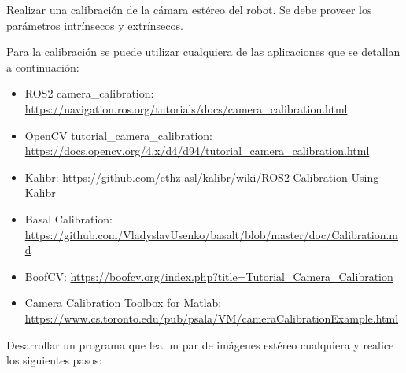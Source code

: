 \documentclass[tp]{lcc}
\begin{document}
\ejercicio Realizar una calibración de la cámara estéreo del robot. Se debe proveer los parámetros intrínsecos y extrínsecos.

\begin{nota}
    Para la calibración se puede utilizar cualquiera de las aplicaciones que se detallan a continuación:
    \begin{itemize}
        \item ROS2 camera\_calibration:  \url{https://navigation.ros.org/tutorials/docs/camera_calibration.html}
        \item OpenCV tutorial\_camera\_calibration:\\ \url{https://docs.opencv.org/4.x/d4/d94/tutorial_camera_calibration.html}
        \item Kalibr: \url{https://github.com/ethz-asl/kalibr/wiki/ROS2-Calibration-Using-Kalibr}
        \item Basal Calibration: \url{https://github.com/VladyslavUsenko/basalt/blob/master/doc/Calibration.md}
        \item BoofCV: \url{https://boofcv.org/index.php?title=Tutorial_Camera_Calibration}
        \item Camera Calibration Toolbox for Matlab:\\ \url{https://www.cs.toronto.edu/pub/psala/VM/cameraCalibrationExample.html}
    \end{itemize}
\end{nota}

\ejercicio Desarrollar un programa que lea un par de imágenes estéreo cualquiera y realice los siguientes pasos:
\end{document}
